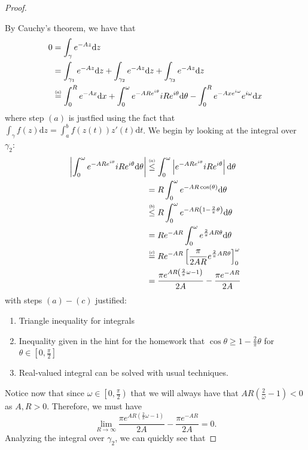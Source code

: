 \documentclass{article}
\newcommand\numeq[1]%
  {\stackrel{\scriptscriptstyle(\mkern-1.5mu#1\mkern-1.5mu)}{=}}
\newcommand\numleq[1]
  {\stackrel{\scriptscriptstyle(\mkern-1.5mu#1\mkern-1.5mu)}{\leq}}
\begin{document}
\begin{proof}
\begin{center}
\begin{tikzpicture}[x=0.75pt,y=0.75pt,yscale=-1,xscale=1]
\end{tikzpicture}
\end{center}
By Cauchy's theorem, we have that 
\begin{align*}
 0 &= \int_{\gamma}e^{-Az} \mathrm{d}z \\
 &= \int_{\gamma_1} e^{-Az} \mathrm{d}z + \int_{\gamma_2}e^{-Az} \mathrm{d}z + \int_{\gamma_3} e^{-Az} \mathrm{d}z \\
 &\numeq{a} \int_0^R e^{-Ax} \mathrm{d}x + \int_0^{\omega}e^{-ARe^{i \theta}} i Re^{i \theta} \mathrm{d}\theta - \int_0^R e^{-Axe^{i \omega}} e^{i \omega}\mathrm{d}x  
\end{align*}
where step $(a)$ is justfied using the fact that $\int_{\gamma} f(z) \mathrm{d}z = \int_a^b f(z(t))z'(t) \mathrm{d}t$. We begin by looking at the integral over $\gamma_2$:
\begin{align*}
  \left|\int_0^{\omega}e^{-ARe^{i \theta}} iRe^{i \theta} \mathrm{d} \theta\right| &\numleq{a} \int_0^{\omega}\left|e^{-ARe^{i \theta}} iRe^{i \theta} \right| \mathrm{d} \theta \\
  &= R \int_0^{\omega} e^{-AR \cos(\theta)} \mathrm{d}\theta \\
  &\numleq{b}R\int_0^{\omega}e^{-AR\left(1 - \frac{2}{\pi}\theta \right)} \mathrm{d}\theta \\
  &= Re^{-AR}\int_0^{\omega}e^{\frac{2}{\pi}AR\theta} \mathrm{d} \theta \\
  &\numeq{c} Re^{-AR} \left[\frac{\pi}{2AR}e^{\frac{2}{\pi}AR\theta}\right]_0^{\omega} \\
  &= \frac{\pi e^{AR\left(\frac{2}{\pi}\omega - 1 \right)}}{2A} - \frac{\pi e^{-AR}}{2A}
\end{align*}  
with steps $(a)-(c)$ justified:
\begin{enumerate}[\indent(a)]
 \item Triangle inequality for integrals
 \item Inequality given in the hint for the homework that $\cos \theta \geq 1 - \frac{2}{\pi}\theta$ for $\theta \in \left[0, \frac{\pi}{2} \right]$
 \item Real-valued integral can be solved with usual techniques. 
\end{enumerate}
Notice now that since $\omega \in \left[0, \frac{\pi}{2} \right)$ that we will always have that $AR \left(\frac{2}{\omega} - 1 \right) < 0$ as $A, R > 0$. Therefore, we must have 
\[
 \lim\limits_{R \to \infty} \frac{\pi e^{AR\left(\frac{2}{\pi}\omega - 1 \right)}}{2A} - \frac{\pi e^{-AR}}{2A} = 0.
\]
Analyzing the integral over $\gamma_2$, we can quickly see that

\end{proof}
\end{document}
